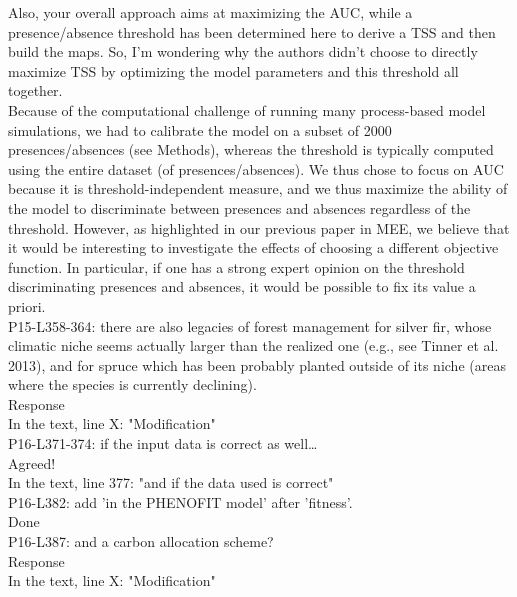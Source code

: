 \documentclass[a4paper, 11pt]{article}
\begin{document}
\noindent Also, your overall approach aims at maximizing the AUC, while a presence/absence threshold has been determined here to derive a TSS and then build the maps. So, I'm wondering why the authors didn't choose to directly maximize TSS by optimizing the model parameters and this threshold all together.\\
\textcolor{customblue}{Because of the computational challenge of running many process-based model simulations, we had to calibrate the model on a subset of 2000 presences/absences (see Methods), whereas the threshold is typically computed using the entire dataset (of presences/absences). We thus chose to focus on AUC because it is threshold-independent measure, and we thus maximize the ability of the model to discriminate between presences and absences regardless of the threshold. However, as highlighted in our previous paper in MEE, we believe that it would be interesting to investigate the effects of choosing a different objective function. In particular, if one has a strong expert opinion on the threshold discriminating presences and absences, it would be possible to fix its value a priori.}\\

\noindent P15-L358-364: there are also legacies of forest management for silver fir, whose climatic niche seems actually larger than the realized one (e.g., see Tinner et al. 2013), and for spruce which has been probably planted outside of its niche (areas where the species is currently declining).\\
\textcolor{customblue}{Response}\\
In the text, line X: \textcolor{customred}{"Modification"}\\ 

\noindent P16-L371-374: if the input data is correct as well…\\
\textcolor{customblue}{Agreed!}\\
In the text, line 377: \textcolor{customred}{"and if the data used is correct"}\\ 

\noindent P16-L382: add 'in the PHENOFIT model' after 'fitness'.\\
\textcolor{customblue}{Done}\\

\noindent P16-L387: and a carbon allocation scheme?\\
\textcolor{customblue}{Response}\\
In the text, line X: \textcolor{customred}{"Modification"}\\ 
\end{document}
